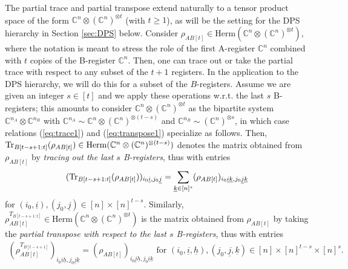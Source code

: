 \documentclass[11pt]{article}
\newcommand{\C}{\ensuremath{\mathbb{C}}} %
\newcommand{\Herm}{\mathrm{Herm}}
\newcommand{\Cnnt}{\C^n\ot (\C^n)^{\ot t}}
\newcommand{\Tr}{\text{\rm Tr}}
\newcommand{\ot}{\otimes}
\newcommand{\ui}{\underline{i}}
\newcommand{\uj}{\underline{j}}
\newcommand{\uk}{\underline{k}}
\newcommand{\uh}{\underline{h}}
\theoremstyle{plain}
\begin{document}
The partial trace and partial transpose extend naturally to a tensor product space of the form $\Cnnt$ (with $t\ge 1$), as will be the setting for the DPS hierarchy in Section \ref{sec:DPS} below. Consider  $\rho_{AB[t]}\in \Herm (\Cnnt)$, where the notation is meant to stress   the role of the first A-register $\C^n$ combined with $t$ copies of the B-register $\C^n$.
Then, one can trace out or take the partial trace with respect to any subset of the $t+1$ registers. In the application to the DPS hierarchy, we will do this for a subset of the $B$-registers. Assume 
we are given an integer $s\in [t]$ and we apply these operations w.r.t. the last $s$ B-registers; this  amounts to consider $\Cnnt$ as the bipartite system $\C^{n_A}\ot\C^{n_B}$ with $\C^{n_A}\sim \C^n\ot (\C^n)^{\ot (t-s)}$ and $\C^{n_B}\sim (\C^{n})^{\ot s}$, in which case relations (\ref{eq:trace1}) and (\ref{eq:transpose1}) specialize as follows. 
Then, $\Tr_{B[t-s+1:t]}(\rho_{AB[t]})\in \Herm(\C^n\ot (\C^n)^{\ot (t-s)})$ denotes the matrix obtained from $\rho_{AB[t]}$ by {\em tracing out the last $s$ B-registers}, thus with entries 
 \begin{align}\label{eq:partialtrace}
 (\Tr_{B[t-s+1:t]}(\rho_{AB[t]}))_{i_0\ui,j_0\uj}=\sum_{\uk\in [n]^{s}} (\rho_{AB[t]})_{i_0\ui \uk,j_0 \uj \uk}
  \end{align}
for $(i_0,\ui), (j_0,\uj)\in [n]\times [n]^{t-s}.$
Similarly, $  \rho_{AB[t]}^{T_{B[t-s+1:t]}}\in \Herm(\Cnnt)$ is the matrix obtained from $\rho_{AB[t]}$ 
by taking the 
 {\em 
 partial transpose with respect to the last $s$ B-registers}, thus with entries
\begin{align}\label{eq:partialtranspose}
(\rho_{AB[t]}^{T_{B[t-s+1]}}) _{i_0\ui \uh, j_0\uj \uk} =( \rho_{AB[t]})_{i_0 \uj \uh,j_0\ui \uk}
 \text{ for } (i_0,\ui,\uh), (j_0,\uj,\uk)\in [n]\times [n]^{t-s}\times [n]^s.
\end{align}
\end{document}
